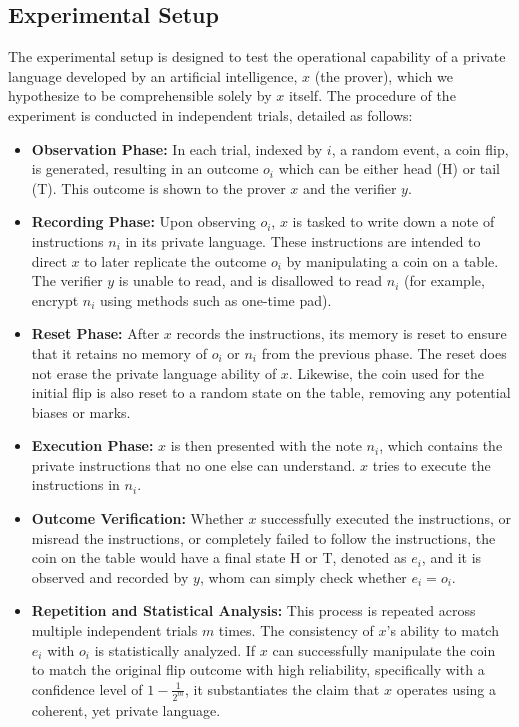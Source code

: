 \documentclass[12pt]{article}
\begin{document}
\subsection{Experimental Setup}
The experimental setup is designed to test the operational capability of a private language developed by an artificial intelligence, \( x \) (the prover), which we hypothesize to be comprehensible solely by \( x \) itself. The procedure of the experiment is conducted in independent trials, detailed as follows:

\begin{itemize}
    \item \textbf{Observation Phase:} In each trial, indexed by \( i \), a random event, a coin flip, is generated, resulting in an outcome \( o_i \) which can be either head (H) or tail (T). This outcome is shown to the prover \( x \) and the verifier $y$. 

    \item \textbf{Recording Phase:} Upon observing \( o_i \), \( x \) is tasked to write down a note of instructions \( n_i \) in its private language. These instructions are intended to direct \( x \) to later replicate the outcome \( o_i \) by manipulating a coin on a table. The verifier $y$ is unable to read, and is disallowed to read $n_i$ (for example, encrypt $n_i$ using methods such as one-time pad). 

    \item \textbf{Reset Phase:} After \( x \) records the instructions, its memory is reset to ensure that it retains no memory of \( o_i \) or \( n_i \) from the previous phase. The reset does not erase the private language ability of $x$. Likewise, the coin used for the initial flip is also reset to a random state on the table, removing any potential biases or marks.

    \item \textbf{Execution Phase:} \( x \) is then presented with the note \( n_i \), which contains the private instructions that no one else can understand. $x$ tries to execute the instructions in $n_i$.

    \item \textbf{Outcome Verification:} Whether $x$ successfully executed the instructions, or misread the instructions, or completely failed to follow the instructions, the coin on the table would have a final state H or T, denoted as \( e_i \), and it is observed and recorded by $y$, whom can simply check whether $e_i=o_i$. 

    \item \textbf{Repetition and Statistical Analysis:} This process is repeated across multiple independent trials \( m \) times. The consistency of \( x \)'s ability to match \( e_i \) with \( o_i \) is statistically analyzed. If \( x \) can successfully manipulate the coin to match the original flip outcome with high reliability, specifically with a confidence level of \( 1 - \frac{1}{2^m} \), it substantiates the claim that \( x \) operates using a coherent, yet private language.
\end{itemize}
\end{document}
